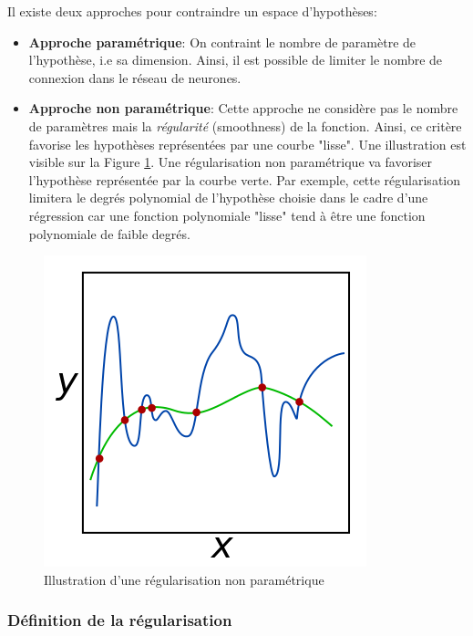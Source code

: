 \noindent Il existe deux approches pour contraindre un espace d'hypothèses:
\begin{itemize}
    \item \textbf{Approche paramétrique}: On contraint le nombre de paramètre de l'hypothèse, i.e sa dimension. Ainsi, il est possible de limiter le nombre de connexion dans le réseau de neurones.\\

    \item \textbf{Approche non paramétrique}: Cette approche ne considère pas le nombre de paramètres mais la \textit{régularité} (smoothness) de la fonction. Ainsi, ce critère favorise les hypothèses représentées par une courbe "lisse". Une illustration est visible sur la Figure \ref{reg_no_param}. Une régularisation non paramétrique va favoriser l'hypothèse représentée par la courbe verte. Par exemple, cette régularisation limitera le degrés polynomial de l'hypothèse choisie dans le cadre d'une régression car une fonction polynomiale "lisse" tend à être une fonction polynomiale de faible degrés.
\end{itemize}

\begin{figure}
    \centering
    \includegraphics[scale=0.3]{./tex/induction/Regularization.png}
    \caption{Illustration d'une régularisation non paramétrique}
    \label{reg_no_param}
\end{figure}

\subsubsection{Définition de la régularisation}

